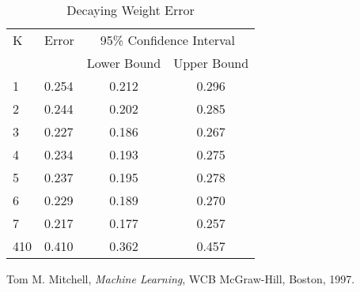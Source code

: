 \documentclass{article}
\begin{document}
\begin{table}
\caption{Decaying Weight Error}
\begin{center}
\begin{tabular}{llcc}
\toprule
K & Error & \multicolumn{2}{c}{95\% Confidence Interval} \\
\cmidrule(r){3-4}
& & Lower Bound & Upper Bound \\
\midrule
1 & 0.254 & 0.212 & 0.296 \\
2 & 0.244 & 0.202 & 0.285 \\
3 & 0.227 & 0.186 & 0.267 \\
4 & 0.234 & 0.193 & 0.275 \\
5 & 0.237 & 0.195 & 0.278 \\
6 & 0.229 & 0.189 & 0.270 \\
7 & 0.217 & 0.177 & 0.257 \\
410 & 0.410 & 0.362 & 0.457 \\
\bottomrule
\end{tabular}
\label{error2}
\end{center}
\end{table}


\begin{thebibliography}{9}

  Tom M. Mitchell,
  \emph{Machine Learning},
  WCB McGraw-Hill, Boston,
  1997.

\end{thebibliography}
\end{document}

